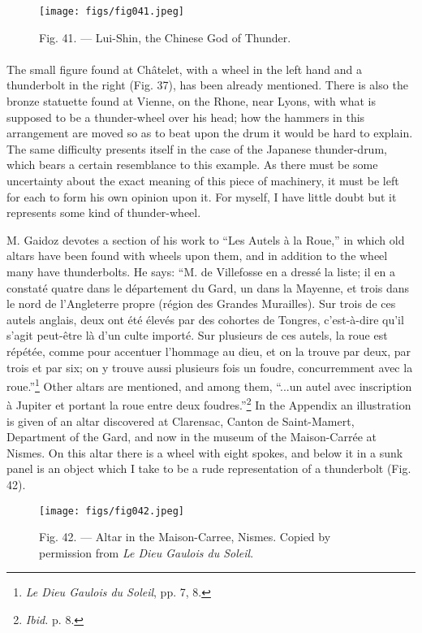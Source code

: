 \documentclass[a4paper, 11pt, oneside, polutonikogreek, english]{article}
\begin{document}
\begin{figure}[H]
\centering
\texttt{[image: figs/fig041.jpeg]}
\caption{Fig. 41. --- Lui-Shin, the Chinese God of Thunder.}
\end{figure}
\paragraph{}
The small figure found at Châtelet, with a wheel in the left hand and a thunderbolt in the right (Fig. 37), has been already mentioned. There is also the bronze statuette found at Vienne, on the Rhone, near Lyons, with what is supposed to be a thunder-wheel over his head; how the hammers in this arrangement are moved so as to beat upon the drum it would be hard to explain. The same difficulty presents itself in the case of the Japanese thunder-drum, which bears a certain resemblance to this example. As there must be some uncertainty about the exact meaning of this piece of machinery, it must be left for each to form his own opinion upon it. For myself, I have little doubt but it represents some kind of thunder-wheel.

M. Gaidoz devotes a section of his work to ``Les Autels à la Roue,'' in which old altars have been found with wheels upon them, and in addition to the wheel many have thunderbolts. He says: ``M. de Villefosse en a dressé la liste; il en a constaté quatre dans le département du Gard, un dans la Mayenne, et trois dans le nord de l'Angleterre propre (région des Grandes Murailles). Sur trois de ces autels anglais, deux ont été élevés par des cohortes de Tongres, c'est-à-dire qu'il s'agit peut-être là d'un culte importé. Sur plusieurs de ces autels, la roue est répétée, comme pour accentuer l'hommage au dieu, et on la trouve par deux, par trois et par six; on y trouve aussi plusieurs fois un foudre, concurremment avec la roue.''\footnote{\emph{Le Dieu Gaulois du Soleil}, pp. 7, 8.} Other altars are mentioned, and among them, ``...un autel avec inscription à Jupiter et portant la roue entre deux foudres.''\footnote{\emph{Ibid.} p. 8.} In the Appendix an illustration is given of an altar discovered at Clarensac, Canton de Saint-Mamert, Department of the Gard, and now in the museum of the Maison-Carrée at Nismes. On this altar there is a wheel with eight spokes, and below it in a sunk panel is an object which I take to be a rude representation of a thunderbolt (Fig. 42).

\begin{figure}[H]
\centering
\texttt{[image: figs/fig042.jpeg]}
\caption[Fig. 42. --- Altar in the Maison-Carree, Nismes.]{Fig. 42. --- Altar in the Maison-Carree, Nismes. Copied by permission from \emph{Le Dieu Gaulois du Soleil}.}
\end{figure}
\end{document}
